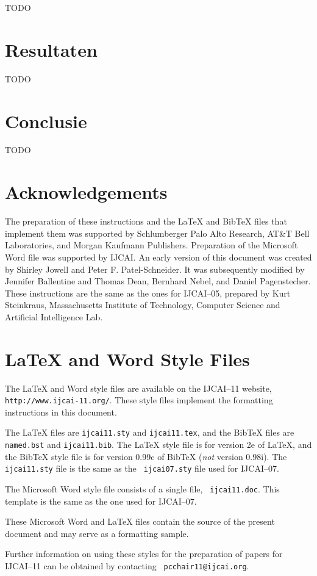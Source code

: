 \documentclass{article}
\begin{document}
TODO

\section{Resultaten}
TODO

\section{Conclusie}
TODO

\section*{Acknowledgements}

The preparation of these instructions and the \LaTeX{} and Bib\TeX{}
files that implement them was supported by Schlumberger Palo Alto
Research, AT\&T Bell Laboratories, and Morgan Kaufmann Publishers.
Preparation of the Microsoft Word file was supported by IJCAI.  An
early version of this document was created by Shirley Jowell and Peter
F. Patel-Schneider.  It was subsequently modified by Jennifer
Ballentine and Thomas Dean, Bernhard Nebel, and Daniel Pagenstecher.
These instructions are the same as the ones for IJCAI--05, prepared by
Kurt Steinkraus, Massachusetts Institute of Technology, Computer
Science and Artificial Intelligence Lab.

\appendix

\section{\LaTeX{} and Word Style Files}\label{stylefiles}

The \LaTeX{} and Word style files are available on the IJCAI--11
website, {\tt http://www.ijcai-11.org/}.
These style files implement the formatting instructions in this
document.

The \LaTeX{} files are {\tt ijcai11.sty} and {\tt ijcai11.tex}, and
the Bib\TeX{} files are {\tt named.bst} and {\tt ijcai11.bib}. The
\LaTeX{} style file is for version 2e of \LaTeX{}, and the Bib\TeX{}
style file is for version 0.99c of Bib\TeX{} ({\em not} version
0.98i). The {\tt ijcai11.sty} file is the same as the {\tt
ijcai07.sty} file used for IJCAI--07.

The Microsoft Word style file consists of a single file, {\tt
ijcai11.doc}. This template is the same as the one used for
IJCAI--07.

These Microsoft Word and \LaTeX{} files contain the source of the
present document and may serve as a formatting sample.  

Further information on using these styles for the preparation of
papers for IJCAI--11 can be obtained by contacting {\tt
pcchair11@ijcai.org}.



\end{document}
